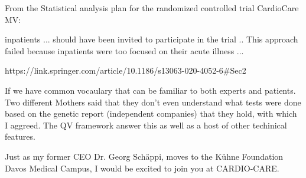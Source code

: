 From the Statistical analysis plan for the randomized controlled trial CardioCare MV:

inpatients ... should have been invited to participate in the trial ..
This approach failed because inpatients were too focused on their acute illness ... 

https://link.springer.com/article/10.1186/s13063-020-4052-6#Sec2

If we have common vocaulary that can be familiar to both experts and patients. 
Two different Mothers said that they don't even understand what tests were done based on the genetic report (independent companies) that they hold, with which I aggreed. 
The QV framework answer this as well as a host of other techinical features. 



Just as my former CEO Dr. Georg Schäppi, moves to the Kühne Foundation Davos Medical Campus, I would be excited to join you at CARDIO-CARE.

